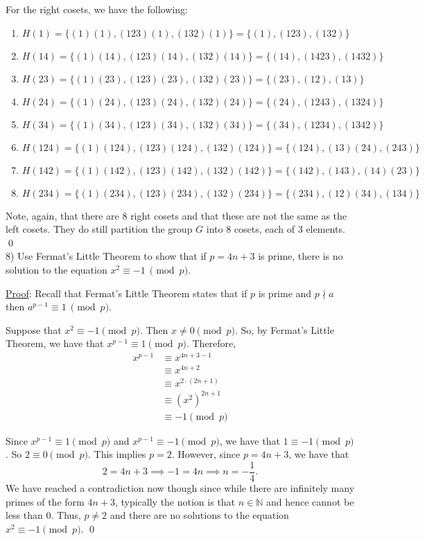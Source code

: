 \documentclass{article}
\begin{document}
For the right cosets, we have the following:
\begin{enumerate}
   \item $H(1) = \{(1)(1), (123)(1), (132)(1) \} = \{(1), (123), (132) \}$
   \item $H(14) = \{(1)(14), (123)(14), (132)(14)\} = \{(14), (1423), (1432) \}$
   \item $H(23) = \{(1)(23), (123)(23), (132)(23) \} = \{ (23), (12), (13) \}$
   \item $H(24) = \{(1)(24), (123)(24), (132)(24) \} = \{ (24), (1243), (1324) \}$
   \item $H(34) = \{(1)(34), (123)(34), (132)(34) \} = \{ (34), (1234), (1342) \}$
   \item $H(124) = \{(1)(124), (123)(124), (132)(124) \} = \{ (124), (13)(24), (243) \}$
   \item $H(142) = \{(1)(142), (123)(142), (132)(142) \} = \{ (142), (143), (14)(23) \}$
   \item $H(234) = \{(1)(234), (123)(234), (132)(234) \} = \{ (234), (12)(34), (134) \}$
\end{enumerate}

Note, again, that there are $8$ right cosets and that these are not the same as the left cosets. They do still partition the group $G$ into $8$ cosets, each of $3$ elements. \qed \\

8) Use Fermat's Little Theorem to show that if $p = 4n + 3$ is prime, there is no solution to the equation $x^2 \equiv -1 \ \pmod p$.

\underline{Proof}: Recall that Fermat's Little Theorem states that if $p$ is prime and $p \nmid a$ then $a^{p-1} \equiv 1 \ \pmod p$.

Suppose that $x^2 \equiv -1 \pmod p$. Then $x \neq 0 \pmod p$. So, by Fermat's Little Theorem, we have that $x^{p-1} \equiv 1 \pmod p$. Therefore, 
\begin{align*}
	x^{p-1} &\equiv x^{4n+3-1} \\
	&\equiv x^{4n+2} \\
	&\equiv x^{2 \cdot (2n+1)} \\
	&\equiv (x^{2})^{2n+1} \\
	&\equiv -1 \pmod p
\end{align*}

Since $x^{p-1} \equiv 1 \pmod p$ and $x^{p-1} \equiv -1 \pmod p$, we have that $1 \equiv -1 \pmod p$. So $2 \equiv 0 \pmod p$. This implies $p = 2$. However, since $p = 4n + 3$, we have that
$$2 = 4n + 3 \implies -1 = 4n \implies n = -\frac{1}{4}.$$ We have reached a contradiction now though since while there are infinitely many primes of the form $4n+3$, typically the notion is that $n \in \mathbb{N}$ and hence cannot be less than $0$. Thus, $p \neq 2$ and there are no solutions to the equation $x^2 \equiv -1 \pmod p$. \qed \\
\end{document}
